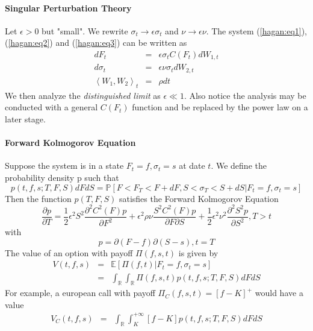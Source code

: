 \documentclass{article}
\begin{document}
\paragraph{Singular Perturbation Theory} Let $\epsilon > 0$ but "small". We rewrite $\sigma_t\rightarrow\epsilon\sigma_t$ and   $\nu\rightarrow\epsilon\nu$. The system (\ref{hagan:eq1}), (\ref{hagan:eq2}) and (\ref{hagan:eq3}) can be written as
%
\begin{eqnarray}
    dF_t      & = & \epsilon\sigma_t C(F_t) dW_{1, t}\label{hagan_t:eq1}\\
    d\sigma_t & = & \epsilon\nu\sigma_t dW_{2, t}\label{hagan_t:eq2}\\
	\left<W_{1}, W_{2}\right>_t & = & \rho dt\label{hagan_t:eq3}
\end{eqnarray}
%
We then analyze the \emph{distinguished limit} as $\epsilon \ll 1$. Also notice the analysis may be conducted with a general $C(F_t)$ function and be replaced by the power law on a later stage.
\paragraph{Forward Kolmogorov Equation} Suppose the system is in a state $F_t = f, \sigma_t=s$  at date $t$. We define the probability density p such that
%
\begin{equation}
p(t, f, s; T, F, S)dFdS = \mathbb P \left[F < F_T<F + dF, S < \sigma_T < S + dS\vert F_t = f, \sigma_t = s \right]
\end{equation}
%
Then the function $p(T, F, S)$ satisfies the Forward Kolmogorov Equation
%
\begin{equation}
\frac{\partial p}{\partial T} =\frac{1}{2}\epsilon^2S^2\frac{\partial^2 C^2(F)p}{\partial F^2} + \epsilon^2\rho\nu\frac{S^2 C^2(F)p}{\partial F\partial S} + \frac{1}{2}\epsilon^2\nu^2\frac{\partial^2 S^2 p}{\partial S^2}, T>t
\end{equation}
%
with 
\begin{equation}
p = \partial(F-f)\partial(S-s), t = T
\end{equation}
%
The value of an option with payoff $\Pi(f, s, t)$ is given by 
%
\begin{eqnarray}
V(t, f, s) & = & \mathbb E \left[\Pi(f, t)\vert F_t = f, \sigma_t = s\right]\\
& = & \int_{\mathbb R}\int_{\mathbb R} \Pi(f, s, t) p(t, f, s; T, F, S)dFdS
\end{eqnarray}
%
For example, a european call with payoff $\Pi_C(f, s, t) = [f-K]^+$ would have a value
%
\begin{eqnarray}
V_C(t, f, s) & = & \int_{\mathbb R}\int_K^{+\infty} [f-K] p(t, f, s; T, F, S)dFdS
\end{eqnarray}
%
\end{document}
